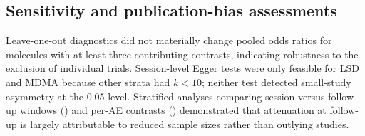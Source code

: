 \subsection{Sensitivity and publication-bias assessments}
Leave-one-out diagnostics did not materially change pooled odds ratios for molecules with at least three contributing contrasts, indicating robustness to the exclusion of individual trials. Session-level Egger tests were only feasible for LSD and MDMA because other strata had $k<10$; neither test detected small-study asymmetry at the 0.05 level. Stratified analyses comparing session versus follow-up windows () and per-AE contrasts () demonstrated that attenuation at follow-up is largely attributable to reduced sample sizes rather than outlying studies.
